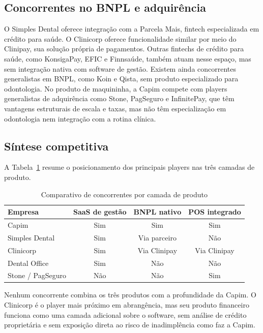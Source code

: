 \subsection{Concorrentes no BNPL e adquirência}

O Simples Dental oferece integração com a Parcela Mais, fintech especializada em crédito para saúde. O Clinicorp oferece funcionalidade similar por meio do Clinipay, sua solução própria de pagamentos. Outras fintechs de crédito para saúde, como KonsigaPay, EFIC e Finnsaúde, também atuam nesse espaço, mas sem integração nativa com software de gestão. Existem ainda concorrentes generalistas em BNPL, como Koin e Qista, sem produto especializado para odontologia. No produto de maquininha, a Capim compete com players generalistas de adquirência como Stone, PagSeguro e InfinitePay, que têm vantagens estruturais de escala e taxas, mas não têm especialização em odontologia nem integração com a rotina clínica.

\subsection{Síntese competitiva}

A Tabela~\ref{tab:concorrentes} resume o posicionamento dos principais players nas três camadas de produto.

\begin{table}[h]
  \centering
  \caption{Comparativo de concorrentes por camada de produto}
  \label{tab:concorrentes}
  \begin{tabular}{lccc}
    \toprule
    \textbf{Empresa} & \textbf{SaaS de gestão} & \textbf{BNPL nativo} & \textbf{POS integrado} \\
    \midrule
    Capim            & Sim & Sim            & Sim            \\
    Simples Dental   & Sim & Via parceiro   & Não            \\
    Clinicorp        & Sim & Via Clinipay   & Via Clinipay   \\
    Dental Office    & Sim & Não            & Não            \\
    Stone / PagSeguro& Não & Não            & Sim            \\
    \bottomrule
  \end{tabular}
\end{table}

Nenhum concorrente combina os três produtos com a profundidade da Capim. O Clinicorp é o player mais próximo em abrangência, mas seu produto financeiro funciona como uma camada adicional sobre o software, sem análise de crédito proprietária e sem exposição direta ao risco de inadimplência como faz a Capim.

